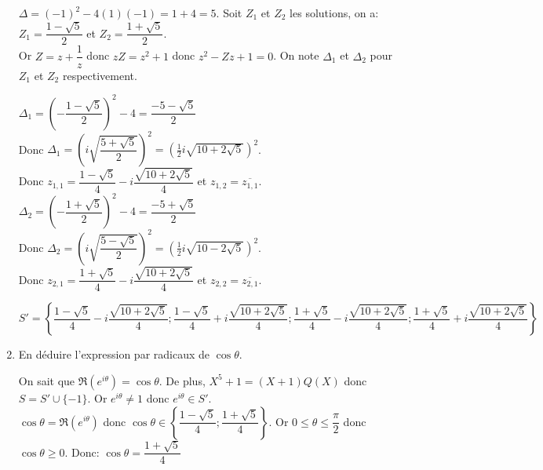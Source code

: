 \documentclass[a4paper,french,bookmarks]{article}
\begin{document}
\begin{enumerate}
\begin{tcolorbox}[colback=black!8,colframe=black!9,boxrule=.25pt,enhanced,arc is angular,arc=0pt]
    $\Delta = (-1)^2-4(1)(-1)=1+4=5$. Soit $Z_1$ et $Z_2$ les solutions, on a: $Z_1=\dfrac{1-\sqrt{5}}{2}$ et $Z_2=\dfrac{1+\sqrt{5}}{2}$.\\
    Or $Z=z+\dfrac{1}{z}$ donc $zZ=z^2+1$ donc $z^2-Zz+1 = 0$. On note $\Delta_1$ et $\Delta_2$ pour $Z_1$ et $Z_2$ respectivement.\\
    \begin{multicols}{2}
$\Delta_1 = \left(-\dfrac{1-\sqrt{5}}{2}\right)^2-4=\dfrac{-5-\sqrt{5}}{2}$\\
Donc $\Delta_1 = \left(i\sqrt{\dfrac{5+\sqrt{5}}{2}}\right)^2 = \left(\frac{1}{2}i\sqrt{10+2\sqrt{5}}\right)^2$.\\
Donc $z_{1,1} = \dfrac{1-\sqrt{5}}{4} - i\dfrac{\sqrt{10 + 2\sqrt{5}}}{4}$ et $z_{1,2} = \overline{z_{1,1}}$.\\
$\Delta_2 = \left(-\dfrac{1+\sqrt{5}}{2}\right)^2-4=\dfrac{-5+\sqrt{5}}{2}$\\
Donc $\Delta_2 = \left(i\sqrt{\dfrac{5-\sqrt{5}}{2}}\right)^2 = \left(\frac{1}{2}i\sqrt{10-2\sqrt{5}}\right)^2$.\\
Donc $z_{2,1} = \dfrac{1+\sqrt{5}}{4} - i\dfrac{\sqrt{10 + 2\sqrt{5}}}{4}$ et $z_{2,2} = \overline{z_{2,1}}$.
\end{multicols}
\[ S' = \left\lbrace\dfrac{1-\sqrt{5}}{4} - i\dfrac{\sqrt{10 + 2\sqrt{5}}}{4};\dfrac{1-\sqrt{5}}{4} + i\dfrac{\sqrt{10 + 2\sqrt{5}}}{4};\dfrac{1+\sqrt{5}}{4} - i\dfrac{\sqrt{10 + 2\sqrt{5}}}{4};\dfrac{1+\sqrt{5}}{4} + i\dfrac{\sqrt{10 + 2\sqrt{5}}}{4}\right\rbrace\]
    \end{tcolorbox}
    \item En déduire l'expression par radicaux de $\cos \theta$.
    \begin{tcolorbox}[colback=black!8,colframe=black!9,boxrule=.25pt,enhanced,arc is angular,arc=0pt]
    On sait que $\Re(e^{i\theta}) = \cos \theta$. De plus, $X^5+1=(X+1)Q(X)$ donc $S = S'\cup\{-1\}$. Or $e^{i\theta} \neq 1$ donc $e^{i\theta} \in S'$.\\
    $\cos \theta = \Re(e^{i\theta}) $ donc $\cos \theta \in \left\lbrace\dfrac{1-\sqrt{5}}{4};\dfrac{1+\sqrt{5}}{4}\right\rbrace$. Or $0 \leq \theta \leq \dfrac{\pi}{2}$ donc $\cos \theta \geq 0$. \qquad Donc:
    $\displaystyle\boxed{\cos \theta = \dfrac{1+\sqrt{5}}{4}}$
    \end{tcolorbox}
\end{enumerate}
\end{document}
